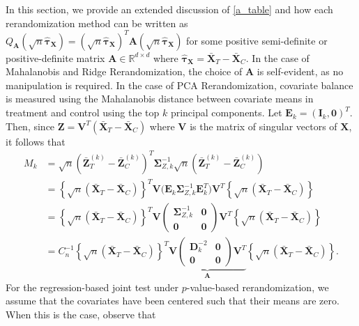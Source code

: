 \documentclass[11pt,twoside]{article}
\theoremstyle{definition}
\theoremstyle{remark}
\begin{document}
In this section, we provide an extended discussion of \cref{a_table} and how each rerandomization method can be written as $Q_{\mathbf{A}}(\sqrt{n} \widehat{\bm{\tau}}_{\mathbf{X}}) = (\sqrt{n} \widehat{\bm{\tau}}_{\mathbf{X}})^T \mathbf{A} (\sqrt{n} \widehat{\bm{\tau}}_{\mathbf{X}})$ for some positive semi-definite or positive-definite matrix $\mathbf{A} \in \mathbb{R}^{d \times d}$ where $\widehat{\bm{\tau}}_{\mathbf{X}} = \bar{\mathbf{X}}_T - \bar{\mathbf{X}}_C$. In the case of Mahalanobis and Ridge Rerandomization, the choice of $\mathbf{A}$ is self-evident, as no manipulation is required. In the case of PCA Rerandomization, covariate balance is measured using the Mahalanobis distance between covariate means in treatment and control using the top $k$ principal components. Let $\mathbf{E}_k = (\mathbf{I}_k, \mathbf{0})^T$. Then, since $\mathbf{Z} = \mathbf{V}^T(\bar{\mathbf{X}}_T - \bar{\mathbf{X}}_C)$ where $\mathbf{V}$ is the matrix of singular vectors of $\mathbf{X}$, it follows that 
\begin{align*}
    M_k &= \sqrt{n}(\bar{\mathbf{Z}}^{(k)}_T - \bar{\mathbf{Z}}^{(k)}_C)^T \mathbf{\Sigma}^{-1}_{Z,k} \sqrt{n}(\bar{\mathbf{Z}}^{(k)}_T - \bar{\mathbf{Z}}^{(k)}_C) \\[0.05in]
    &= \left\{\sqrt{n}(\bar{\mathbf{X}}_T - \bar{\mathbf{X}}_C) \right\}^T \mathbf{V} \Big(\mathbf{E}_k \mathbf{\Sigma}^{-1}_{Z,k}  \mathbf{E}^T_k \Big) \mathbf{V}^T \left\{\sqrt{n}(\bar{\mathbf{X}}_T - \bar{\mathbf{X}}_C) \right\} \\[0.05in]
    &= \left\{\sqrt{n}(\bar{\mathbf{X}}_T - \bar{\mathbf{X}}_C) \right\}^T \mathbf{V} \begin{pmatrix}
        \mathbf{\Sigma}_{Z,k}^{-1} & \mathbf{0} \\[0.05in]
        \mathbf{0} & \mathbf{0}
    \end{pmatrix} \mathbf{V}^T \left\{\sqrt{n}(\bar{\mathbf{X}}_T - \bar{\mathbf{X}}_C) \right\} \\
    &= C^{-1}_n \left\{\sqrt{n}(\bar{\mathbf{X}}_T - \bar{\mathbf{X}}_C) \right\}^T \underbrace{\mathbf{V} \begin{pmatrix}
        \mathbf{D}^{-2}_k & \mathbf{0} \\
        \mathbf{0} & \mathbf{0}
    \end{pmatrix} \mathbf{V}^T}_{\mathbf{A}} \left\{\sqrt{n}(\bar{\mathbf{X}}_T - \bar{\mathbf{X}}_C) \right\}.
\end{align*}
For the regression-based joint test under $p$-value-based rerandomization, we assume that the covariates have been centered such that their means are zero. When this is the case, observe that
\end{document}
